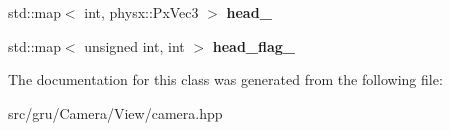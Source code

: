 \begin{DoxyCompactItemize}
\item 
\hypertarget{classneb_1_1camera_1_1camera_ad7207f50c2cfe3402fa57334f7557d03}{std\-::map$<$ int, physx\-::\-Px\-Vec3 $>$ {\bfseries head\-\_\-}}\label{classneb_1_1camera_1_1camera_ad7207f50c2cfe3402fa57334f7557d03}

\item 
\hypertarget{classneb_1_1camera_1_1camera_a011e06042be1b866b098f91ff2413921}{std\-::map$<$ unsigned int, int $>$ {\bfseries head\-\_\-flag\-\_\-}}\label{classneb_1_1camera_1_1camera_a011e06042be1b866b098f91ff2413921}

\end{DoxyCompactItemize}


\-The documentation for this class was generated from the following file\-:\begin{DoxyCompactItemize}
\item 
src/gru/\-Camera/\-View/camera.\-hpp\end{DoxyCompactItemize}
